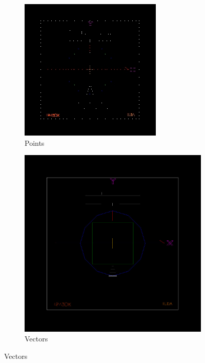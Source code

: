 \begin{en}
\begin{figure}[ht]
	\begin{bigcenter}
        \begin{subfigure}[b]{0.6\textwidth}
                \includegraphics[width=\textwidth]{images/comp/ildatestpattern_256x256_point.jpg}
                \caption{Points}
                \label{fig:ilda_pattern_point}
        \end{subfigure}
        \begin{subfigure}[b]{0.6\textwidth}
                \includegraphics[width=\textwidth]{images/comp/ildatestpattern.jpg}
                \caption{Vectors}
                \label{fig:ilda_pattern_vector}
        \end{subfigure}
        

\end{bigcenter}
\end{figure}
\end{en}
